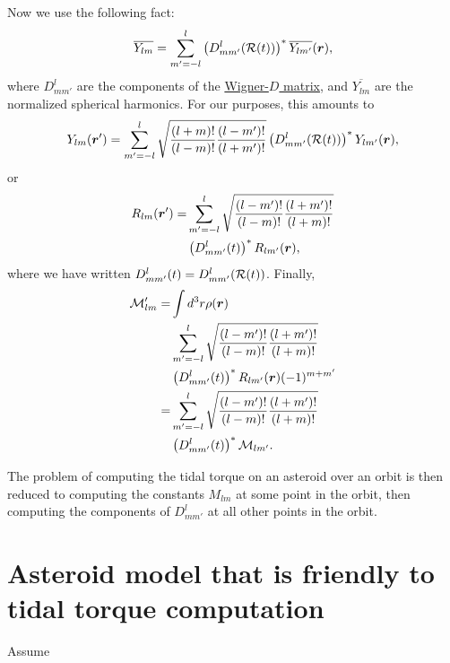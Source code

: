 \documentclass[aps,twocolumn,secnumarabic,balancelastpage,amsmath,amssymb,nofootinbib,floatfix]{revtex4-1}
\begin{document}
Now we use the following fact:
$$\overline{Y_{lm}} = \sum_{m'=-l}^l\left( D^l_{mm'}(\mathcal{R}(t)) \right)^*\overline{Y_{lm'}}(\bm r),$$
where $D^l_{mm'}$ are the components of the \href{https://en.wikipedia.org/wiki/Wigner_D-matrix#Relation_to_spherical_harmonics_and_Legendre_polynomials}{Wigner-$D$ matrix}, and $\overline{Y_{lm}}$ are the normalized spherical harmonics. For our purposes, this amounts to
$$Y_{lm}(\bm r') = \sum_{m'=-l}^l\sqrt{\frac{(l+m)!}{(l-m)!}\frac{(l-m')!}{(l+m')!}}\left( D^l_{mm'}(\mathcal{R}(t)) \right)^*Y_{lm'}(\bm r),$$
or
\begin{equation*}
\begin{aligned}
R_{lm}(\bm r') = &\sum_{m'=-l}^l\sqrt{\frac{(l-m')!}{(l-m)!}\frac{(l+m')!}{(l+m)!}}\\
&\left( D^l_{mm'}(t) \right)^*R_{lm'}(\bm r),
\end{aligned}
\end{equation*}
where we have written $D^l_{mm'}(t)=D^l_{mm'}(\mathcal{R}(t))$. Finally,
\begin{equation*}
\begin{aligned}
\mathcal{M}'_{lm} =& \int d^3 r \rho(\bm r) \\
&\sum_{m'=-l}^l\sqrt{\frac{(l-m')!}{(l-m)!}\frac{(l+m')!}{(l+m)!}}\\
&\left( D^l_{mm'}(t) \right)^*R_{lm'}(\bm r)(-1)^{m+m'}\\
=&\sum_{m'=-l}^l\sqrt{\frac{(l-m')!}{(l-m)!}\frac{(l+m')!}{(l+m)!}}\\
&\left( D^l_{mm'}(t) \right)^*\mathcal{M}_{lm'}.
\end{aligned}
\end{equation*}

The problem of computing the tidal torque on an asteroid over an orbit is then reduced to computing the constants $M_{lm}$ at some point in the orbit, then computing the components of $D^l_{mm'}$ at all other points in the orbit.

\section{Asteroid model that is friendly to tidal torque computation}
Assume
\end{document}
